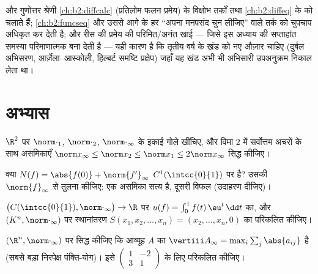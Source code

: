\begin{remark}[यह अध्याय कहाँ काम आता है]
 और गुणोत्तर श्रेणी \cref{ch:b2:diffcalc} (प्रतिलोम फलन प्रमेय) के विक्षोभ
तर्कों तथा \cref{ch:b2:diffeq} के  को चलाते हैं;  \cref{ch:b2:funcseq}
और उससे आगे के हर ``अपना मनपसंद  चुन लीजिए'' वाले तर्क को चुपचाप
अधिकृत कर देती है; और रीस की प्रमेय की परिमित/अनंत खाई --- जिसे इस
अध्याय की सप्ताहांत समस्या परिमाणात्मक बना देती है --- यही कारण है कि
तृतीय वर्ष के खंड को नए औज़ार चाहिए (दुर्बल अभिसरण,
आर्ज़ेला--आस्कोली, हिल्बर्ट समष्टि प्रक्षेप) जहाँ यह खंड अभी भी अभिसारी
उपअनुक्रम निकाल लेता था।
\end{remark}

\section{अभ्यास}

\begin{exercise}[$\star$]\label{exo:b2:nvs:1}
$\R^2$ पर $\norm\cdot_1$, $\norm\cdot_2$, $\norm\cdot_\infty$ के इकाई गोले खींचिए, और विमा $2$ में सर्वोत्तम
अचरों के साथ असमिकाएँ $\norm x_\infty
\leq \norm x_2 \leq \norm x_1 \leq 2\norm x_\infty$ सिद्ध कीजिए।
\end{exercise}

\begin{exercise}[$\star$]\label{exo:b2:nvs:2}
क्या $N(f) = \abs{f(0)} + \norm{f'}_\infty$ $C^1(\intcc{0}{1})$ पर  है? उसकी $\norm{f}_\infty$ से तुलना कीजिए: एक असमिका सत्य है,
दूसरी विफल (उदाहरण दीजिए)।
\end{exercise}

\begin{exercise}[$\star$]\label{exo:b2:nvs:3}
$\bigl(C(\intcc{0}{1}), \norm\cdot_\infty\bigr) \to \R$ पर $u(f) = \int_0^1 f(t)\,\eu^t\,\dd t$ का, और $(K^n, \norm\cdot_\infty)$ पर स्थानांतरण $S(x_1, x_2, \dots, x_n) = (x_2, \dots, x_n, 0)$ का  परिकलित
कीजिए।
\end{exercise}

\begin{exercise}[$\star\star$]\label{exo:b2:nvs:4}
$(\R^n, \norm\cdot_\infty)$ पर सिद्ध कीजिए कि आव्यूह $A$ का  $\vertiii A_\infty = \max_i \sum_j \abs{a_{ij}}$ है (सबसे बड़ा
निरपेक्ष पंक्ति-योग)। इसे $\begin{pmatrix} 1 & -2\\
3 & 1\end{pmatrix}$ के लिए परिकलित कीजिए।
\end{exercise}

